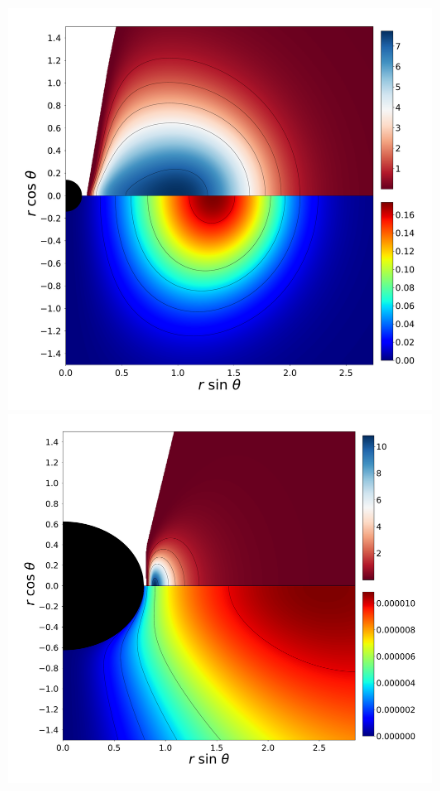 \documentclass[twocolumn,aps,showpacs,showkeys,prd,superscriptaddress,byrevtex, amsmath]{revtex4-1}
\begin{document}
\begin{figure}
\includegraphics[scale=0.12]{figures/fig6_VII_10.pdf}
\hspace{-0.2cm}
\\
\includegraphics[scale=0.12]{figures/fig6_I__10.pdf}
\hspace{-0.4cm}

\end{figure}
\end{document}
